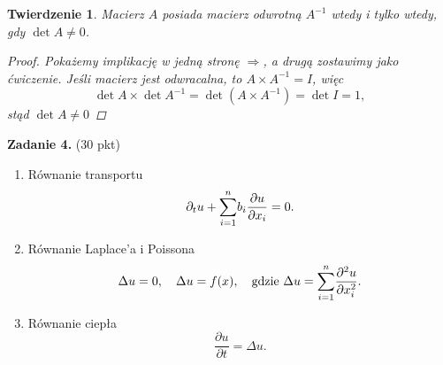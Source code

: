 \documentclass[a4paper,10pt]{article}
\newtheorem{twierdzenie}[definicja]{Twierdzenie}
\begin{document}
\begin{twierdzenie}
	Macierz $A$ posiada macierz odwrotną $A^{-1}$ wtedy i tylko wtedy, gdy $\det A \ne 0$.
	\begin{proof}
		Pokażemy implikację w jedną stronę $\Rightarrow$, a drugą zostawimy jako ćwiczenie. Jeśli macierz jest odwracalna, to $A \times A^{-1} = I$, więc 
		\[
			\det A \times \det A^{-1} = \det (A \times A^{-1}) = \det I = 1,	
		\]
		stąd $\det A \ne 0$ 
	\end{proof}
\end{twierdzenie}

\textbf{Zadanie 4.} (30 pkt) 
\begin{enumerate}
	\item Równanie transportu
	\[
		\partial_t u + \underset{i=1}{\overset{n}{\ensuremath \sum}} b_i \frac{\partial u}{\partial x_i} = 0.
	\]
	\item Równanie Laplace'a i Poissona
	\[
		\Delta u = 0, \quad \Delta u = f(x), \quad \text{gdzie } \Delta u = \underset{i=1}{\overset{n}{\ensuremath \sum}} \frac{\partial^2u}{\partial x_i^2}.
	\]
	\item Równanie ciepła
	\[
		\frac{\partial u}{\partial t} = \Delta u.
	\]
	
\end{enumerate}
\end{document}
